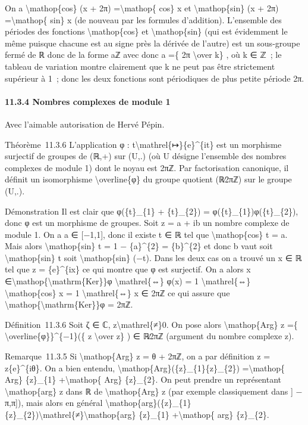 \documentclass[]{article}
\begin{document}
On a \textbackslash{}mathop\{cos\} (x + 2π) =\textbackslash{}mathop\{
cos\} x et \textbackslash{}mathop\{sin\} (x + 2π)
=\textbackslash{}mathop\{ sin\} x (de nouveau par les formules
d'addition). L'ensemble des périodes des fonctions
\textbackslash{}mathop\{cos\} et \textbackslash{}mathop\{sin\} (qui est
évidemment le même puisque chacune est au signe près la dérivée de
l'autre) est un sous-groupe fermé de ℝ donc de la forme aℤ avec donc a
=\{ 2π \textbackslash{}over k\} , où k ∈ ℤ~; le tableau de variation
montre clairement que k ne peut pas être strictement supérieur à 1~;
donc les deux fonctions sont périodiques de plus petite période 2π.

\paragraph{11.3.4 Nombres complexes de module 1}

Avec l'aimable autorisation de Hervé Pépin.

Théorème~11.3.6 L'application φ :
t\textbackslash{}mathrel\{↦\}\{e\}\^{}\{it\} est un morphisme surjectif
de groupes de (ℝ,+) sur (U,.) (où U désigne l'ensemble des nombres
complexes de module 1) dont le noyau est 2πℤ. Par factorisation
canonique, il définit un isomorphisme \textbackslash{}overline\{φ\} du
groupe quotient (ℝ∕2πℤ) sur le groupe (U,.).

Démonstration Il est clair que φ(\{t\}\_\{1\} + \{t\}\_\{2\}) =
φ(\{t\}\_\{1\})φ(\{t\}\_\{2\}), donc φ est un morphisme de groupes. Soit
z = a + ib un nombre complexe de module 1. On a a ∈ {[}−1,1{]}, donc il
existe t ∈ ℝ tel que \textbackslash{}mathop\{cos\} t = a. Mais alors
\textbackslash{}mathop\{sin\} t = 1 − \{a\}\^{}\{2\} = \{b\}\^{}\{2\} et
donc b vaut soit \textbackslash{}mathop\{sin\} t soit
\textbackslash{}mathop\{sin\} (−t). Dans les deux cas on a trouvé un x ∈
ℝ tel que z = \{e\}\^{}\{ix\} ce qui montre que φ est surjectif. On a
alors x ∈\textbackslash{}mathop\{\textbackslash{}mathrm\{Ker\}\}φ
\textbackslash{}mathrel\{⇔\} φ(x) = 1 \textbackslash{}mathrel\{⇔\}
\textbackslash{}mathop\{cos\} x = 1 \textbackslash{}mathrel\{⇔\} x ∈ 2πℤ
ce qui assure que
\textbackslash{}mathop\{\textbackslash{}mathrm\{Ker\}\}φ = 2πℤ.

Définition~11.3.6 Soit ζ ∈ ℂ, z\textbackslash{}mathrel\{≠\}0. On pose
alors \textbackslash{}mathop\{Arg\} z =\{
\textbackslash{}overline\{φ\}\}\^{}\{−1\}(\{ z \textbackslash{}over
\textbar{}z\textbar{}\} ) ∈ ℝ∕2πℤ (argument du nombre complexe z).

Remarque~11.3.5 Si \textbackslash{}mathop\{Arg\} z = θ + 2πℤ, on a par
définition z = \textbar{}z\textbar{}\{e\}\^{}\{iθ\}. On a bien entendu,
\textbackslash{}mathop\{Arg\}(\{z\}\_\{1\}\{z\}\_\{2\})
=\textbackslash{}mathop\{ Arg\} \{z\}\_\{1\} +\textbackslash{}mathop\{
Arg\} \{z\}\_\{2\}. On peut prendre un représentant
\textbackslash{}mathop\{arg\} z dans ℝ de \textbackslash{}mathop\{Arg\}
z (par exemple classiquement dans {]} − π,π{]}), mais alors en général
\textbackslash{}mathop\{arg\}(\{z\}\_\{1\}\{z\}\_\{2\})\textbackslash{}mathrel\{≠\}\textbackslash{}mathop\{arg\}
\{z\}\_\{1\} +\textbackslash{}mathop\{ arg\} \{z\}\_\{2\}.
\end{document}
